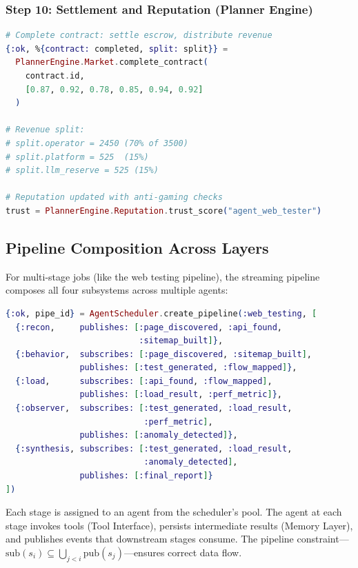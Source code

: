 \documentclass[12pt,a4paper]{article}
\theoremstyle{definition}
\begin{document}
\subsubsection{Step 10: Settlement and Reputation (Planner Engine)}

\begin{lstlisting}[language=elixir, caption={Escrow settlement and reputation update}]
# Complete contract: settle escrow, distribute revenue
{:ok, %{contract: completed, split: split}} =
  PlannerEngine.Market.complete_contract(
    contract.id,
    [0.87, 0.92, 0.78, 0.85, 0.94, 0.92]
  )

# Revenue split:
# split.operator = 2450 (70% of 3500)
# split.platform = 525  (15%)
# split.llm_reserve = 525 (15%)

# Reputation updated with anti-gaming checks
trust = PlannerEngine.Reputation.trust_score("agent_web_tester")
\end{lstlisting}

\subsection{Pipeline Composition Across Layers}

For multi-stage jobs (like the web testing pipeline), the streaming pipeline
composes all four subsystems across multiple agents:

\begin{lstlisting}[language=elixir, caption={Streaming pipeline across subsystems}]
{:ok, pipe_id} = AgentScheduler.create_pipeline(:web_testing, [
  {:recon,     publishes: [:page_discovered, :api_found,
                           :sitemap_built]},
  {:behavior,  subscribes: [:page_discovered, :sitemap_built],
               publishes: [:test_generated, :flow_mapped]},
  {:load,      subscribes: [:api_found, :flow_mapped],
               publishes: [:load_result, :perf_metric]},
  {:observer,  subscribes: [:test_generated, :load_result,
                            :perf_metric],
               publishes: [:anomaly_detected]},
  {:synthesis, subscribes: [:test_generated, :load_result,
                            :anomaly_detected],
               publishes: [:final_report]}
])
\end{lstlisting}

Each stage is assigned to an agent from the scheduler's pool. The agent
at each stage invokes tools (Tool Interface), persists intermediate results
(Memory Layer), and publishes events that downstream stages consume.
The pipeline constraint---$\text{sub}(s_i) \subseteq \bigcup_{j < i} \text{pub}(s_j)$---ensures
correct data flow.
\end{document}
